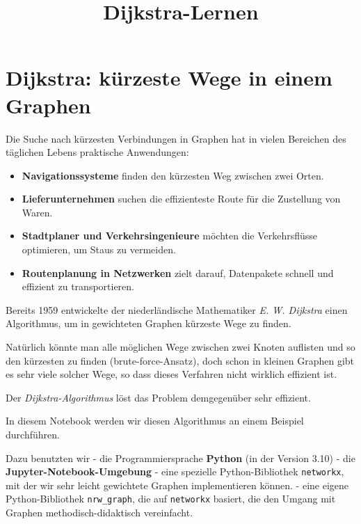 \documentclass[11pt]{article}
\title{Dijkstra-Lernen}
\providecommand{\tightlist}{%
      \setlength{\itemsep}{0pt}\setlength{\parskip}{0pt}}
\begin{document}
    
    \maketitle
    
    

    
    \hypertarget{dijkstra-kuxfcrzeste-wege-in-einem-graphen}{%
\section{Dijkstra: kürzeste Wege in einem
Graphen}\label{dijkstra-kuxfcrzeste-wege-in-einem-graphen}}

    Die Suche nach kürzesten Verbindungen in Graphen hat in vielen Bereichen
des täglichen Lebens praktische Anwendungen:

\begin{itemize}
\tightlist
\item
  \textbf{Navigationssysteme} finden den kürzesten Weg zwischen zwei
  Orten.
\item
  \textbf{Lieferunternehmen} suchen die effizienteste Route für die
  Zustellung von Waren.
\item
  \textbf{Stadtplaner und Verkehrsingenieure} möchten die Verkehrsflüsse
  optimieren, um Staus zu vermeiden.
\item
  \textbf{Routenplanung in Netzwerken} zielt darauf, Datenpakete schnell
  und effizient zu transportieren.
\end{itemize}

Bereits 1959 entwickelte der niederländische Mathematiker \emph{E. W.
Dijkstra} einen Algorithmus, um in gewichteten Graphen kürzeste Wege zu
finden.

Natürlich könnte man alle möglichen Wege zwischen zwei Knoten auflisten
und so den kürzesten zu finden (brute-force-Ansatz), doch schon in
kleinen Graphen gibt es sehr viele solcher Wege, so dass dieses
Verfahren nicht wirklich effizient ist.

Der \emph{Dijkstra-Algorithmus} löst das Problem demgegenüber sehr
effizient.

    In diesem Notebook werden wir diesen Algorithmus an einem Beispiel
durchführen.

Dazu benutzten wir - die Programmiersprache \textbf{Python} (in der
Version 3.10) - die \textbf{Jupyter-Notebook-Umgebung} - eine spezielle
Python-Bibliothek \texttt{networkx}, mit der wir sehr leicht gewichtete
Graphen implementieren können. - eine eigene Python-Bibliothek
\texttt{nrw\_graph}, die auf \texttt{networkx} basiert, die den Umgang
mit Graphen methodisch-didaktisch vereinfacht.
\end{document}
